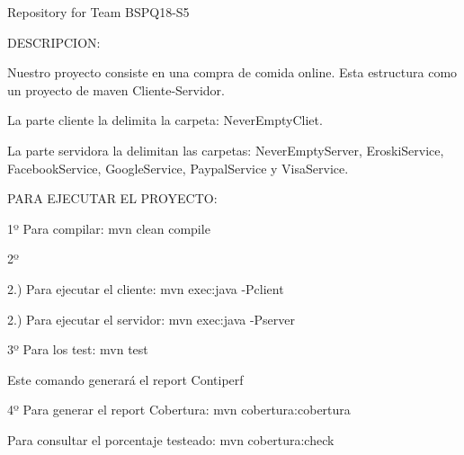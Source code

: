 Repository for Team B\+S\+P\+Q18-\/\+S5

D\+E\+S\+C\+R\+I\+P\+C\+I\+ON\+:

Nuestro proyecto consiste en una compra de comida online. Esta estructura como un proyecto de maven Cliente-\/\+Servidor.

La parte cliente la delimita la carpeta\+: Never\+Empty\+Cliet.

La parte servidora la delimitan las carpetas\+: Never\+Empty\+Server, Eroski\+Service, Facebook\+Service, Google\+Service, Paypal\+Service y Visa\+Service.

P\+A\+RA E\+J\+E\+C\+U\+T\+AR EL P\+R\+O\+Y\+E\+C\+TO\+:

1º Para compilar\+: mvn clean compile

2º

2.) Para ejecutar el cliente\+: mvn exec\+:java -\/\+Pclient

2.) Para ejecutar el servidor\+: mvn exec\+:java -\/\+Pserver

3º Para los test\+: mvn test

Este comando generará el report Contiperf

4º Para generar el report Cobertura\+: mvn cobertura\+:cobertura

Para consultar el porcentaje testeado\+: mvn cobertura\+:check 